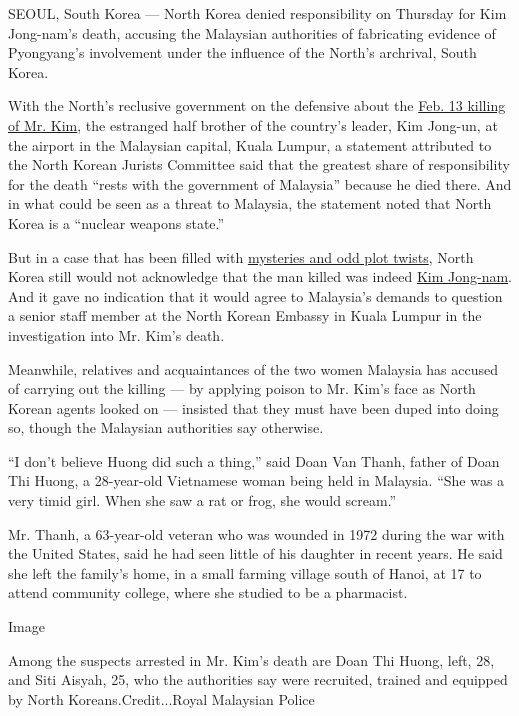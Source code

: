 SEOUL, South Korea --- North Korea denied responsibility on Thursday for
Kim Jong-nam's death, accusing the Malaysian authorities of fabricating
evidence of Pyongyang's involvement under the influence of the North's
archrival, South Korea.

With the North's reclusive government on the defensive about the
\href{https://www.nytimes3xbfgragh.onion/2017/02/14/world/asia/kim-jong-un-brother-killed-malaysia.html}{Feb.
13 killing of Mr. Kim}, the estranged half brother of the country's
leader, Kim Jong-un, at the airport in the Malaysian capital, Kuala
Lumpur, a statement attributed to the North Korean Jurists Committee
said that the greatest share of responsibility for the death ``rests
with the government of Malaysia'' because he died there. And in what
could be seen as a threat to Malaysia, the statement noted that North
Korea is a ``nuclear weapons state.''

But in a case that has been filled with
\href{https://www.nytimes3xbfgragh.onion/2017/02/22/world/asia/kim-jong-nam-assassination-korea-malaysia.html}{mysteries
and odd plot twists}, North Korea still would not acknowledge that the
man killed was indeed
\href{https://www.nytimes3xbfgragh.onion/2017/02/15/world/asia/kim-jong-nam-assassination-north-korea.html}{Kim
Jong-nam}. And it gave no indication that it would agree to Malaysia's
demands to question a senior staff member at the North Korean Embassy in
Kuala Lumpur in the investigation into Mr. Kim's death.

Meanwhile, relatives and acquaintances of the two women Malaysia has
accused of carrying out the killing --- by applying poison to Mr. Kim's
face as North Korean agents looked on --- insisted that they must have
been duped into doing so, though the Malaysian authorities say
otherwise.

``I don't believe Huong did such a thing,'' said Doan Van Thanh, father
of Doan Thi Huong, a 28-year-old Vietnamese woman being held in
Malaysia. ``She was a very timid girl. When she saw a rat or frog, she
would scream.''

Mr. Thanh, a 63-year-old veteran who was wounded in 1972 during the war
with the United States, said he had seen little of his daughter in
recent years. He said she left the family's home, in a small farming
village south of Hanoi, at 17 to attend community college, where she
studied to be a pharmacist.

Image

Among the suspects arrested in Mr. Kim's death are Doan Thi Huong, left,
28, and Siti Aisyah, 25, who the authorities say were recruited, trained
and equipped by North Koreans.Credit...Royal Malaysian Police

